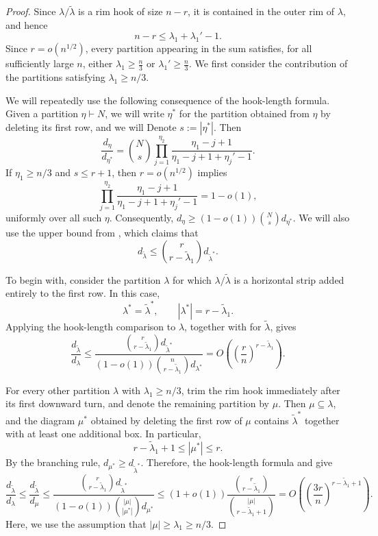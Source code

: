\begin{proof}
Since $\lambda/\widetilde\lambda$ is a rim hook of size $n-r$, it is
contained in the outer rim of $\lambda$, and hence
$$
n-r\le \lambda_1+\lambda_1'-1.
$$
Since $r=o(n^{1/2})$, every partition appearing in the sum satisfies, for all sufficiently large $n$, either
$\lambda_1\ge \frac n3$ or $\lambda_1'\ge \frac n3$. We first consider the contribution of the partitions satisfying $\lambda_1\ge n/3$.

We will repeatedly use the following consequence of the hook-length
formula. Given a partition $\eta\vdash N$, we will write $\eta^*$ for the partition obtained from $\eta$ by deleting its first row, and we will Denote $s:=|\eta^*|$. Then
$$
\frac{d_\eta}{d_{\eta^*}}
=
\binom{N}{s}
\prod_{j=1}^{\eta_2}
\frac{\eta_1-j+1}
{\eta_1-j+1+\eta_j'-1}.
$$
If $\eta_1\ge n/3$ and $s\le r+1$, then $r=o(n^{1/2})$ implies
$$
\prod_{j=1}^{\eta_2}
\frac{\eta_1-j+1}
{\eta_1-j+1+\eta_j'-1}
=1-o(1),
$$
uniformly over all such $\eta$. Consequently,
$d_\eta\ge(1-o(1))\binom{N}{s}d_{\eta^*}$.
We will also use the upper bound from
, which claims that
$$
d_{\widetilde\lambda}
\le
\binom{r}{r-\widetilde\lambda_1}
d_{\widetilde\lambda^*}.
$$

To begin with, consider the partition $\lambda$ for which $\lambda/\widetilde\lambda$ is a horizontal strip added entirely to the first row. In this case,
$$
\lambda^*=\widetilde\lambda^*,
\qquad
|\lambda^*|=r-\widetilde\lambda_1.
$$
Applying the hook-length comparison to $\lambda$, together with
 for $\widetilde\lambda$, gives
$$\frac{d_{\widetilde\lambda}}{d_\lambda}\le\frac{
\binom{r}{r-\widetilde\lambda_1}
d_{\widetilde\lambda^*}
}{(1-o(1))\binom{n}{r-\widetilde\lambda_1}
d_{\lambda^*}}=O\left(
\left(\frac{r}{n}\right)^{r-\widetilde\lambda_1}
\right).$$

For every other partition $\lambda$ with $\lambda_1\ge n/3$, trim the
rim hook immediately after its first downward turn, and denote the
remaining partition by $\mu$. Then $\mu\subseteq\lambda$, and the
diagram $\mu^*$ obtained by deleting the first row of $\mu$ contains
$\widetilde\lambda^*$ together with at least one additional box. In
particular,
$$
r-\widetilde\lambda_1+1\le |\mu^*|\le r.
$$
By the branching rule, $d_{\mu^*}\ge d_{\widetilde\lambda^*}$. Therefore, the hook-length formula and
 give
$$\frac{d_{\widetilde\lambda}}{d_\lambda}\le\frac{d_{\widetilde\lambda}}{d_\mu}\le\frac{\binom{r}{r-\widetilde\lambda_1}d_{\widetilde\lambda^*}
}{(1-o(1))\binom{|\mu|}{|\mu^*|}d_{\mu^*}}\le(1+o(1))\frac{\binom{r}{r-\widetilde\lambda_1}}{\binom{|\mu|}{r-\widetilde\lambda_1+1}}=O\left(\left(\frac{3r}{n}\right)^{r-\widetilde\lambda_1+1}\right).$$
Here, we use the assumption that $|\mu|\ge \lambda_1\ge n/3$.


\end{proof}
